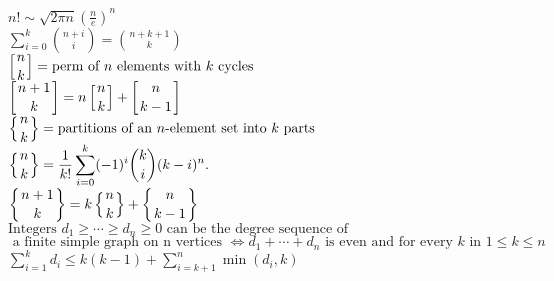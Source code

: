 $\displaystyle n!\sim {\sqrt {2\pi n}}\left({\frac {n}{e}}\right)^{n}$ \\
$\displaystyle \sum \limits_{i= 0}^k{n+i \choose i} = {n+k+1 \choose k}$ \\
${\displaystyle \left[{n \atop k}\right]} =\text{perm of }n \text{ elements with } k \text{ cycles}$ \\
${\displaystyle \left[{n+1 \atop k}\right]=n\left[{n \atop k}\right]+\left[{n \atop k-1}\right]}$ \\
${\displaystyle \left\{{n \atop k}\right\}}= \text{partitions of an }n\text{-element set into } k \text{ parts}$ \\
${\displaystyle \left\{{n \atop k}\right\}={\frac {1}{k!}}\sum _{i=0}^{k}(-1)^{i}{\binom {k}{i}}(k-i)^{n}.}$ \\
${\displaystyle \left\{{n+1 \atop k}\right\}=k\left\{{n \atop k}\right\}+\left\{{n \atop k-1}\right\}}$ \\
$\text {Integers } d_{1}\geq \cdots \geq d_{n} \geq 0 \text { can be the degree sequence of }$ \\
$\text { a finite simple graph on n vertices }\iff d_{1}+\cdots +d_{n} \text { is even and for every } k \text { in } 1\leq k\leq n $ \\
${\displaystyle \sum _{i=1}^{k}d_{i}\leq k(k-1)+\sum _{i=k+1}^{n}\min(d_{i},k)}$

